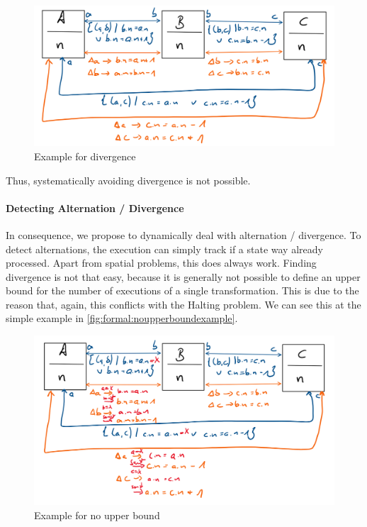 \begin{figure}
    \centering
    \includegraphics[width=\textwidth]{figures/correctness/formal/divergence_example.png}
    \caption{Example for divergence}
    \label{fig:formal:divergenceexample}
\end{figure}

Thus, systematically avoiding divergence is not possible. 



\paragraph{Detecting Alternation / Divergence}

In consequence, we propose to dynamically deal with alternation / divergence.
To detect alternations, the execution can simply track if a state way already processed. Apart from spatial problems, this does always work.
Finding divergence is not that easy, because it is generally not possible to define an upper bound for the number of executions of a single transformation.
This is due to the reason that, again, this conflicts with the Halting problem.
We can see this at the simple example in \autoref{fig:formal:noupperboundexample}.

\begin{figure}
    \centering
    \includegraphics[width=\textwidth]{figures/correctness/formal/no_upper_bound_example.png}
    \caption{Example for no upper bound}
    \label{fig:formal:noupperboundexample}
\end{figure}

